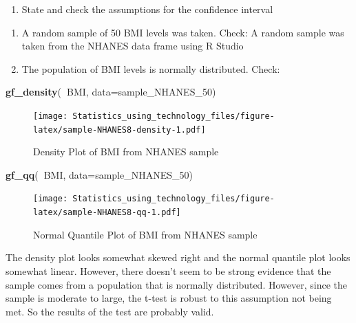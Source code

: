 \documentclass[
]{book}
\newenvironment{Shaded}{\begin{snugshade}}{\end{snugshade}}
\newcommand{\DataTypeTok}[1]{\textcolor[rgb]{0.13,0.29,0.53}{#1}}
\newcommand{\DecValTok}[1]{\textcolor[rgb]{0.00,0.00,0.81}{#1}}
\newcommand{\KeywordTok}[1]{\textcolor[rgb]{0.13,0.29,0.53}{\textbf{#1}}}
\newcommand{\NormalTok}[1]{#1}
\newcommand{\OperatorTok}[1]{\textcolor[rgb]{0.81,0.36,0.00}{\textbf{#1}}}
\providecommand{\tightlist}{%
  \setlength{\itemsep}{0pt}\setlength{\parskip}{0pt}}
\begin{document}
\begin{enumerate}
\def\labelenumi{\arabic{enumi}.}
\setcounter{enumi}{1}
\tightlist
\item
  State and check the assumptions for the confidence interval
\end{enumerate}

\begin{enumerate}
\def\labelenumi{\alph{enumi}.}
\item
  A random sample of 50 BMI levels was taken. Check: A random sample was taken from the NHANES data frame using R Studio
\item
  The population of BMI levels is normally distributed. Check:
\end{enumerate}



\begin{Shaded}
\begin{Highlighting}[]
\KeywordTok{gf_density}\NormalTok{(}\OperatorTok{~}\NormalTok{BMI, }\DataTypeTok{data=}\NormalTok{sample_NHANES_}\DecValTok{50}\NormalTok{)}
\end{Highlighting}
\end{Shaded}

\begin{figure}
\centering
\texttt{[image: Statistics\_using\_technology\_files/figure-latex/sample-NHANES8-density-1.pdf]}
\caption{\label{fig:sample-NHANES8-density}Density Plot of BMI from NHANES sample}
\end{figure}



\begin{Shaded}
\begin{Highlighting}[]
\KeywordTok{gf_qq}\NormalTok{(}\OperatorTok{~}\NormalTok{BMI, }\DataTypeTok{data=}\NormalTok{sample_NHANES_}\DecValTok{50}\NormalTok{)}
\end{Highlighting}
\end{Shaded}

\begin{figure}
\centering
\texttt{[image: Statistics\_using\_technology\_files/figure-latex/sample-NHANES8-qq-1.pdf]}
\caption{\label{fig:sample-NHANES8-qq}Normal Quantile Plot of BMI from NHANES sample}
\end{figure}

The density plot looks somewhat skewed right and the normal quantile plot looks somewhat linear. However, there doesn't seem to be strong evidence that the sample comes from a population that is normally distributed. However, since the sample is moderate to large, the t-test is robust to this assumption not being met. So the results of the test are probably valid.
\end{document}
